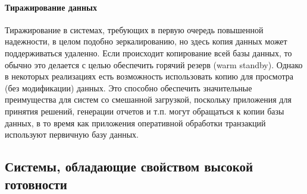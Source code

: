 \paragraph{Тиражирование данных}
Тиражирование в системах, требующих в первую очередь повышенной надежности, в
целом подобно зеркалированию, но здесь копия данных может поддерживаться
удаленно. Если происходит копирование всей базы данных, то обычно это делается с
целью обеспечить горячий резерв (warm standby). Однако в некоторых реализациях
есть возможность использовать копию для просмотра (без модификации) данных. Это
способно обеспечить значительные преимущества для систем со смешанной
загрузкой, поскольку приложения для принятия решений, генерации отчетов и т.п.
могут обращаться к копии базы данных, в то время как приложения оперативной
обработки транзакций используют первичную базу данных.
\subsection{Системы, обладающие свойством высокой готовности}
